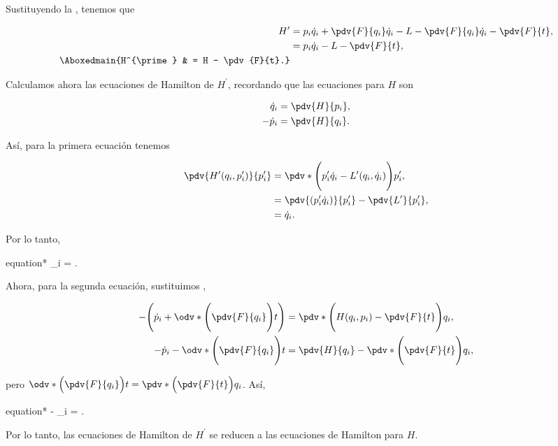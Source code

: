 \documentclass[../main.tex]{subfiles}
\begin{document}
\begin{problema}
	Sustituyendo la , tenemos que

	\begin{align}
		H^{\prime}             & = p_{i} \dot{q}_{i} + \pdv{F}{q_{i}} \dot{q}_{i} - L - \pdv{F}{q_{i}} \dot{q}_{i} - \pdv{F}{t},\nonumber \\
		                       & = p_{i} \dot{q}_{i} - L - \pdv{F}{t},\nonumber                                                           \\
		\Aboxedmain{H^{\prime} & = H - \pdv{F}{t}.}\label{eq:prime-hamiltonian}
	\end{align}

	Calculamos ahora las ecuaciones de Hamilton de \(H^{\prime}\), recordando que las
	ecuaciones para \(H\) son

	\begin{align*}
		\dot{q}_{i}   & = \pdv{H}{p_{i}}, \\
		- \dot{p}_{i} & = \pdv{H}{q_{i}}.
	\end{align*}

	Así, para la primera ecuación tenemos

	\begin{align*}
		\pdv{H^{\prime}(q_{i}, p_{i}^{\prime})}{p_{i}^{\prime}} & = \pdv*{\Biggl(p_{i}^{\prime} \dot{q}_{i} - L^{\prime}(q_{i}, \dot{q}_{i})\Biggr)}{p_{i}^{\prime}}, \\
		                                                        & = \pdv{(p_{i}^{\prime} \dot{q}_{i})}{p_{i}^{\prime}} - \pdv{L^{\prime}}{p_{i}^{\prime}},            \\
		                                                        & = \dot{q}_{i}.
	\end{align*}

	Por lo tanto,

	\begin{empheq}[box = \mainresult]{equation*}
		_{i} = .
	\end{empheq}

	Ahora, para la segunda ecuación, sustituimos ,

	\begin{align*}
		-\Biggl(\dot{p}_{i} + \odv*{\Biggl(\pdv{F}{q_{i}}\Biggr)}{t}\Biggr) & =
		\pdv*{\Biggl(H(q_{i}, p_{i}) - \pdv{F}{t}\Biggr)}{q_{i}},               \\
		- \dot{p}_{i} - \odv*{\Biggl(\pdv{F}{q_{i}}\Biggr)}{t}              & =
		\pdv{H}{q_{i}} - \pdv*{\Biggl(\pdv{F}{t}\Biggr)}{q_{i}},
	\end{align*}

	pero \(\odv*{\Bigl(\pdv{F}{q_{i}}\Bigr)}{t} = \pdv*{\Bigl(\pdv{F}{t}\Bigr)}{q_{i}}\).
	Así,

	\begin{empheq}[box = \mainresult]{equation*}
		- _{i} = .
	\end{empheq}

	Por lo tanto, las ecuaciones de Hamilton de \(H^{\prime}\) se reducen
	a las ecuaciones de Hamilton para \(H\).
\end{problema}
\end{document}
